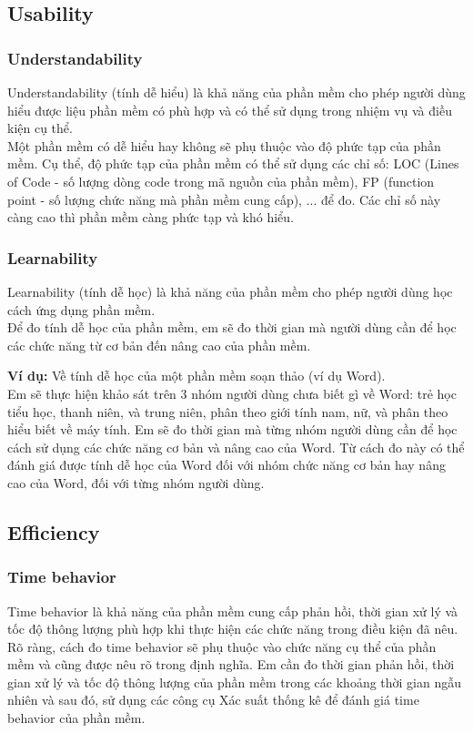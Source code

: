 \documentclass[14pt]{extarticle}
\begin{document}
\subsection{Usability}
\subsubsection{Understandability}
Understandability (tính dễ hiểu) là khả năng của phần mềm cho phép người dùng
hiểu được liệu phần mềm có phù hợp và có thể sử dụng trong nhiệm vụ và
điều kiện cụ thể.\\
Một phần mềm có dễ hiểu hay không sẽ phụ thuộc vào độ phức tạp của phần mềm.
Cụ thể, độ phức tạp của phần mềm có thể sử dụng các chỉ số: 
LOC (Lines of Code - số lượng dòng code trong mã nguồn của phần mềm), 
FP (function point - số lượng chức năng mà phần mềm cung cấp), ... để đo.
Các chỉ số này càng cao thì phần mềm càng phức tạp và khó hiểu.

\subsubsection{Learnability}
Learnability (tính dễ học) là khả năng của phần mềm cho phép người dùng
học cách ứng dụng phần mềm.\\
Để đo tính dễ học của phần mềm, em sẽ đo thời gian mà người dùng cần
để học các chức năng từ cơ bản đến nâng cao của phần mềm.

\textbf{Ví dụ:} Về tính dễ học của một phần mềm soạn thảo (ví dụ Word).\\
Em sẽ thực hiện khảo sát trên 3 nhóm người dùng chưa biết gì về Word:
trẻ học tiểu học, thanh niên, và trung niên,
phân theo giới tính nam, nữ, và phân theo hiểu biết về máy tính.
Em sẽ đo thời gian mà từng nhóm người dùng cần để học cách sử dụng
các chức năng cơ bản và nâng cao của Word.
Từ cách đo này có thể đánh giá được tính dễ học của Word đối với
nhóm chức năng cơ bản hay nâng cao của Word, đối với từng nhóm người dùng.





\subsection{Efficiency}
\subsubsection{Time behavior}
Time behavior là khả năng của phần mềm cung cấp
phản hồi, thời gian xử lý và tốc độ thông lượng phù hợp khi thực hiện các
chức năng trong điều kiện đã nêu.\\
Rõ ràng, cách đo time behavior sẽ phụ thuộc vào chức năng cụ thể của phần mềm
và cũng được nêu rõ trong định nghĩa.
Em cần đo thời gian phản hồi, thời gian xử lý và tốc độ thông lượng của phần mềm
trong các khoảng thời gian ngẫu nhiên và sau đó, sử dụng các công cụ Xác suất
thống kê để đánh giá time behavior của phần mềm.
\end{document}
